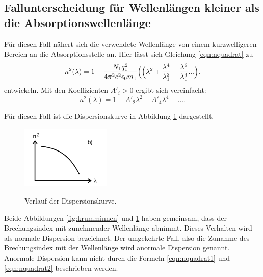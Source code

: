 \subsection{Fallunterscheidung für Wellenlängen kleiner als die Absorptionswellenlänge}%
Für diesen Fall nähert sich die verwendete Wellenlänge von einem kurzwelligeren
Bereich an die Absorptionsstelle an. Hier lässt sich Gleichung
\ref{eqn:nquadrat} zu
\begin{equation}
  n^2(\lambda)=1-\frac{N_1 q^{2}_1}{4\pi^2c^2\epsilon_0 m_1}
  \Bigl(\Bigl(\lambda^2+\frac{\lambda^4}{\lambda^{2}_1}+\frac{\lambda^6}{\lambda^{4}_1}...\Bigr).
  \label{eqn:nquadratpotenz2}
\end{equation}
entwickeln. Mit den Koeffizienten $A'_i>0$ ergibt sich vereinfacht:
\begin{equation}
  n^2(\lambda)=1-A'_2 \lambda^2 -A'_4 \lambda^4-....
  \label{eqn:nquadrat2}
\end{equation}

Für diesen Fall ist die Dispersionskurve in Abbildung \ref{fig:krummaußen}
dargestellt.

\begin{figure}[H]
  \centering
  \includegraphics[height=3cm]{n2.png}
  \caption{Verlauf der Dispersionskurve.}
  \label{fig:krummaußen}
  \cite{skript}
\end{figure}


Beide Abbildungen \ref{fig:krumminnen} und \ref{fig:krummaußen} haben gemeinsam, dass
der Brechungsindex mit zunehmender Wellenlänge abnimmt. Dieses Verhalten wird als
normale Dispersion bezeichnet. Der umgekehrte Fall, also die Zunahme des
Brechungsindex mit der Wellenlänge wird anormale Dispersion genannt.
Anormale Dispersion kann nicht durch die Formeln \ref{eqn:nquadrat1} und
\ref{eqn:nquadrat2} beschrieben werden.

